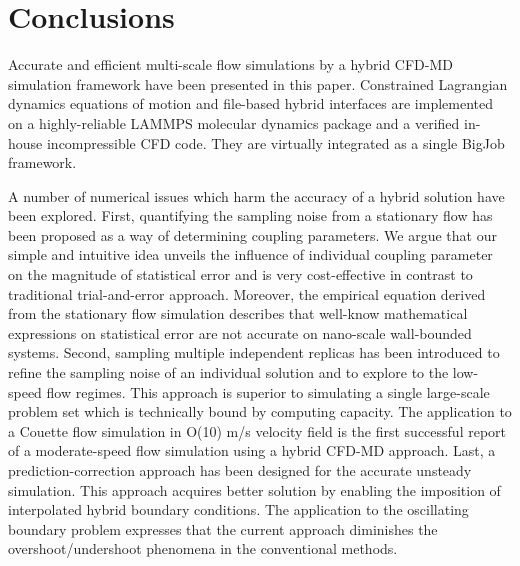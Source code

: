\documentclass[preprint,12pt]{elsarticle}
\begin{document}



\section{Conclusions}
\label{sec:conclusion}

Accurate and efficient multi-scale flow simulations by a hybrid CFD-MD simulation framework have been presented in this paper. Constrained Lagrangian dynamics equations of motion and file-based hybrid interfaces are implemented on a highly-reliable LAMMPS molecular dynamics package and a verified in-house incompressible CFD code. They are virtually integrated as a single BigJob framework.

A number of numerical issues which harm the accuracy of a hybrid solution have been explored. First, quantifying the sampling noise from a stationary flow has been proposed as a way of determining coupling parameters. We argue that our simple and intuitive idea unveils the influence of individual coupling parameter on the magnitude of statistical error and is very cost-effective in contrast to traditional trial-and-error approach.
Moreover, the empirical equation derived from the stationary flow simulation describes that well-know mathematical expressions on statistical error are not accurate on nano-scale wall-bounded systems.
Second, sampling multiple independent replicas has been introduced to refine the sampling noise of an individual solution and to explore to the low-speed flow regimes. This approach is superior to simulating a single large-scale problem set which is technically bound by computing capacity. The application to a Couette flow simulation in O(10) m/s velocity field is the first successful report of a moderate-speed flow simulation using a hybrid CFD-MD approach.
Last, a prediction-correction approach has been designed for the accurate unsteady simulation. This approach acquires better solution by enabling the imposition of interpolated hybrid boundary conditions. The application to the oscillating boundary problem expresses that the current approach diminishes the overshoot/undershoot phenomena in the conventional methods.
\end{document}
